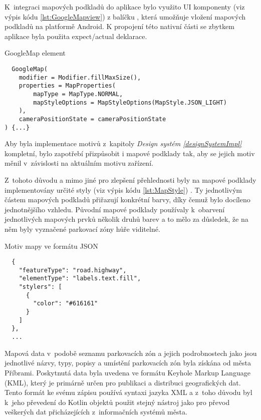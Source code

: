 K~integraci mapových podkladů do aplikace bylo využito UI komponenty  (viz výpis kódu \ref{lst:GoogleMapview}) z balíčku 
, která umožňuje vložení mapových podkladů na platformě Android. K propojení této nativní části 
se zbytkem aplikace byla použita expect/actual deklarace.


\begin{listing}[H]
\caption{GoogleMap element}\label{lst:GoogleMapview}
\begin{verbatim}
  GoogleMap(
    modifier = Modifier.fillMaxSize(),
    properties = MapProperties(
        mapType = MapType.NORMAL,
        mapStyleOptions = MapStyleOptions(MapStyle.JSON_LIGHT)
    ),
    cameraPositionState = cameraPositionState
) {...}
\end{verbatim}
\end{listing}


Aby byla implementace motivů z~kapitoly \textit{Design systém \ref{designSystemImpl}} kompletní, bylo zapotřebí přizpůsobit i mapové podklady tak,
aby se jejich motiv měnil v~závislosti na aktuálním motivu zařízení.

Z~tohoto důvodu a mimo jiné pro zlepšení přehlednosti byly na mapové podklady implementovány určité styly (viz výpis kódu \ref{lst:MapStyle}) \cite{googleStyles}.
Ty jednotlivým částem mapových podkladů přiřazují konkrétní barvy, díky čemuž bylo docíleno jednotnějšího vzhledu. Původní mapové podklady
používaly k~obarvení jednotlivých mapových prvků několik druhů barev a to mělo za důsledek, že na něm byly vyznačené parkovací zóny hůře viditelné.

\begin{listing}[H]
\caption{Motiv mapy ve formátu JSON}\label{lst:MapStyle}
\begin{verbatim}
  {
    "featureType": "road.highway",
    "elementType": "labels.text.fill",
    "stylers": [
      {
        "color": "#616161"
      }
    ]
  },
  ...
\end{verbatim}
\end{listing}

Mapová data v~podobě seznamu parkovacích zón a jejich podrobnostech jako jsou jednotlivé názvy, typy, popisy a umístění parkovacích zón byla 
získána od města Příbrami. Poskytnutá data byla uvedena ve formátu Keyhole Markup Language (KML), který je primárně určen pro publikaci a 
distribuci geografických dat. Tento formát ke svému zápisu používá syntaxi jazyka XML a z~toho důvodu byl k~jeho převedení do Kotlin objektů 
použit stejný nástroj jako pro převod veškerých dat přicházejících z~informačních systémů města.

